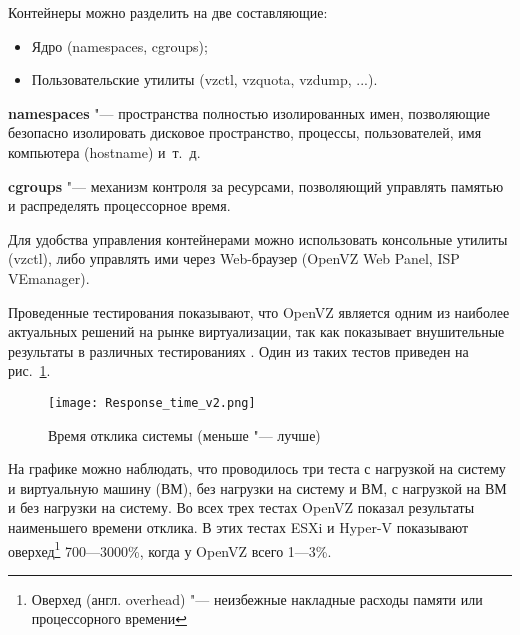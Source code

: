 Контейнеры можно разделить на две составляющие:
\begin{itemize}
    \item Ядро (namespaces, cgroups);
    \item Пользовательские утилиты (vzctl, vzquota, vzdump, ...).
\end{itemize}
 
\textbf{namespaces} "--- пространства полностью изолированных имен, позволяющие безопасно изолировать дисковое пространство, процессы, пользователей, имя компьютера (hostname) и~т.~д.

\textbf{cgroups} "--- механизм контроля за ресурсами, позволяющий управлять памятью и распределять процессорное время.

Для удобства управления контейнерами можно использовать консольные утилиты (vzctl), либо управлять ими через Web-браузер (OpenVZ Web Panel, ISP VEmanager).

Проведенные тестирования показывают, что OpenVZ является одним из наиболее актуальных решений на рынке виртуализации, так как показывает внушительные результаты в различных тестированиях \cite{padala2007performance}.
Один из таких тестов \cite{openvzperformance} приведен на рис.~\ref{pic:openvz_tests}.

\begin{figure}[ht]
    \centering
	\texttt{[image: Response\_time\_v2.png]}
	\caption{Время отклика системы (меньше "--- лучше)}\label{pic:openvz_tests}
\end{figure}

На графике можно наблюдать, что проводилось три теста с нагрузкой на систему и виртуальную машину (ВМ), без нагрузки на систему и ВМ, с нагрузкой на ВМ и без нагрузки на систему.
Во всех трех тестах OpenVZ показал результаты наименьшего времени отклика. 
В этих тестах ESXi и Hyper-V показывают оверхед\footnote{Оверхед (англ. overhead) "--- неизбежные накладные расходы памяти или процессорного времени} 700---3000\%, когда у OpenVZ всего 1---3\%.

\clearpage
